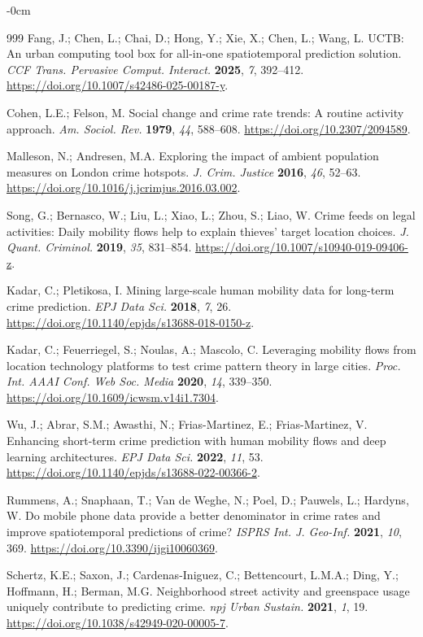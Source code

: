 \documentclass[applsci,article,accept,moreauthors]{Definitions/mdpi}
\begin{document}
\begin{adjustwidth}{-\extralength}{0cm}
\begin{thebibliography}{999}
Fang, J.; Chen, L.; Chai, D.; Hong, Y.; Xie, X.; Chen, L.; Wang, L.
UCTB: An urban computing tool box for all-in-one spatiotemporal prediction
solution. \emph{CCF Trans. Pervasive Comput. Interact.} \textbf{2025},
\emph{7}, 392--412.
\url{https://doi.org/10.1007/s42486-025-00187-y}.


Cohen, L.E.; Felson, M. Social change and crime rate trends: A routine
activity approach. \emph{Am. Sociol. Rev.} \textbf{1979}, \emph{44},
588--608. \url{https://doi.org/10.2307/2094589}.

Malleson, N.; Andresen, M.A. Exploring the impact of ambient population
measures on London crime hotspots. \emph{J. Crim. Justice} \textbf{2016},
\emph{46}, 52--63.
\url{https://doi.org/10.1016/j.jcrimjus.2016.03.002}.

Song, G.; Bernasco, W.; Liu, L.; Xiao, L.; Zhou, S.; Liao, W. Crime feeds
on legal activities: Daily mobility flows help to explain thieves' target
location choices. \emph{J. Quant. Criminol.} \textbf{2019}, \emph{35},
831--854. \url{https://doi.org/10.1007/s10940-019-09406-z}.

Kadar, C.; Pletikosa, I. Mining large-scale human mobility data for long-term
crime prediction. \emph{EPJ Data Sci.} \textbf{2018}, \emph{7}, 26.
\url{https://doi.org/10.1140/epjds/s13688-018-0150-z}.

Kadar, C.; Feuerriegel, S.; Noulas, A.; Mascolo, C. Leveraging mobility
flows from location technology platforms to test crime pattern theory in
large cities. \emph{Proc. Int. AAAI Conf. Web Soc. Media} \textbf{2020},
\emph{14}, 339--350.
\url{https://doi.org/10.1609/icwsm.v14i1.7304}.

Wu, J.; Abrar, S.M.; Awasthi, N.; Frias-Martinez, E.; Frias-Martinez, V.
Enhancing short-term crime prediction with human mobility flows and deep
learning architectures. \emph{EPJ Data Sci.} \textbf{2022}, \emph{11}, 53.
\url{https://doi.org/10.1140/epjds/s13688-022-00366-2}.

Rummens, A.; Snaphaan, T.; Van de Weghe, N.; Poel, D.; Pauwels, L.; Hardyns, W. Do mobile phone data provide a better denominator in crime rates and improve spatiotemporal predictions of crime? \emph{ISPRS Int. J. Geo-Inf.} \textbf{2021}, \emph{10}, 369. \url{https://doi.org/10.3390/ijgi10060369}.

Schertz, K.E.; Saxon, J.; Cardenas-Iniguez, C.; Bettencourt, L.M.A.; Ding, Y.; Hoffmann, H.; Berman, M.G. Neighborhood street activity and greenspace usage uniquely contribute to predicting crime. \emph{npj Urban Sustain.} \textbf{2021}, \emph{1}, 19. \url{https://doi.org/10.1038/s42949-020-00005-7}.


\end{thebibliography}
\end{adjustwidth}
\end{document}
